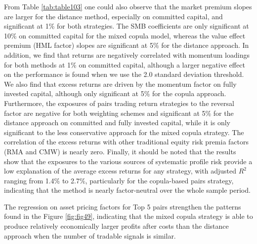 \documentclass[a4paper]{article}
\begin{document}
	From Table \ref{tab:table103} one could also observe that the market premium slopes are larger for the distance method, especially on committed capital, and significant at 1\% for both strategies. The SMB coefficients are only significant at 10\% on committed capital for the mixed copula model, whereas the value effect premium (HML factor) slopes are significant at 5\% for the distance approach. In addition, we find that returns are negatively correlated with momentum loadings for both methods at 1\% on committed capital, although a larger negative effect on the performance is found when we use the 2.0 standard deviation threshold. We also find that excess returns are driven by the momentum factor on fully invested capital, although only significant at 5\% for the copula approach. Furthermore, the exposures of pairs trading return strategies to the reversal factor are negative for both weighting schemes and significant at 5\% for the distance approach on committed and fully invested capital, while it is only significant to the less conservative approach for the mixed copula strategy. The correlation of the excess returns with other traditional equity risk premia factors (RMA and CMW) is nearly zero. Finally, it should be noted that the results show that the exposures to the various	sources of systematic profile risk provide a low explanation of the average excess returns for any strategy, with adjusted $R^2$ ranging from  1.4\% to 2.7\%, particularly for the copula-based pairs strategy, indicating that the method is nearly factor-neutral over the whole sample period.
	
The regression on asset pricing factors for Top 5 pairs strengthen the patterns found in the Figure \ref{fig:fig49}, indicating that the mixed copula strategy is able to produce relatively economically larger profits after costs than the distance approach when the number of tradable signals is similar. 
\end{document}
